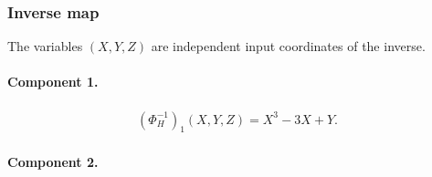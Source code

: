 \endgroup

\clearpage

\subsubsection*{Inverse map}

The variables $(X,Y,Z)$ are independent input coordinates of the inverse.

\paragraph{Component 1.}

\begingroup\small\allowdisplaybreaks[4]

\begin{gather*}(\Phi_H^{-1})_1(X,Y,Z)=X^3-3X+Y.\end{gather*}

\endgroup

\paragraph{Component 2.}

\begingroup\footnotesize\allowdisplaybreaks[4]
\setlength{\jot}{1pt}

